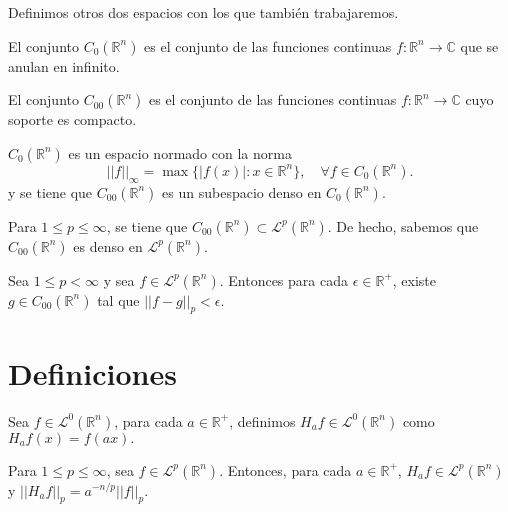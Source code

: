 \noindent Definimos otros dos espacios con los que también trabajaremos.
\begin{definicion}
    El conjunto $C_{0}(\mathbb{R}^n)$ es el conjunto de las funciones continuas $f: \mathbb{R}^n \rightarrow \mathbb{C}$ que se anulan en infinito.
\end{definicion}
\begin{definicion}
    El conjunto $C_{00}(\mathbb{R}^n)$ es el conjunto de las funciones continuas $f: \mathbb{R}^n \rightarrow \mathbb{C}$ cuyo soporte es compacto.
\end{definicion}
\begin{proposicion}
    $C_{0}(\mathbb{R}^n)$ es un espacio normado con la norma 
    \begin{equation}
        ||f||_\infty = \max\{|f(x)|: x \in \mathbb{R}^n\} ,\quad \forall f \in C_{0}(\mathbb{R}^n).
    \end{equation}
    y se tiene que  $C_{00}(\mathbb{R}^n)$ es un subespacio denso en $C_{0}(\mathbb{R}^n)$.
\end{proposicion}


\noindent Para $ 1 \leq p \leq \infty$, se tiene que $C_{00}(\mathbb{R}^n) \subset \mathscr{L}^p(\mathbb{R}^n) $. De hecho, sabemos que $C_{00}(\mathbb{R}^n)$ es denso en $\mathscr{L}^p(\mathbb{R}^n)$. 
\begin{teorema}\label{teo:sc}
    Sea $1 \leq p < \infty$ y sea $f \in \mathscr{L}^p(\mathbb{R}^n)$. Entonces para cada $\epsilon \in \mathbb{R}^+$, existe $g \in C_{00}(\mathbb{R}^n)$ tal que $||f-g||_p < \epsilon$.
\end{teorema}

\section{Definiciones}

 \begin{definicion}
    Sea $f \in \mathscr{L}^0(\mathbb{R}^n)$, para cada $a \in \mathbb{R}^+$, definimos $H_af \in \mathscr{L}^0(\mathbb{R}^n) $ como $H_af(x)=f(ax).$
\end{definicion}
\begin{proposicion}
    Para $ 1\leq p \leq \infty$, sea $f \in \mathscr{L}^p(\mathbb{R}^n)$. Entonces, para cada $a \in \mathbb{R}^+$,  $H_af \in \mathscr{L}^p(\mathbb{R}^n) $ y $||H_af||_p = a^{-n/p}||f||_p$.
\end{proposicion}

